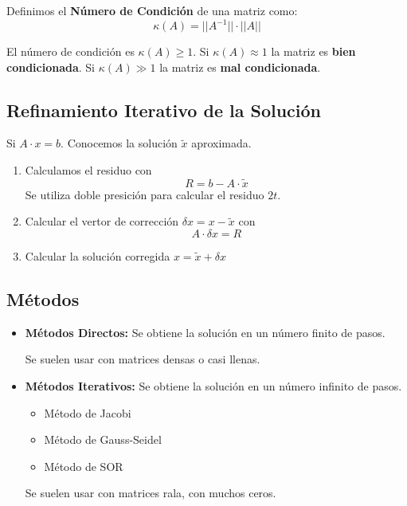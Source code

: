 \documentclass[../main.tex]{subfiles}
\begin{document}
        Definimos el \textbf{Número de Condición} de una matriz como:
        \begin{equation}
            \kappa(A) = ||A^{-1}|| \cdot ||A||
        \end{equation}

        El número de condición es $\kappa(A) \geq 1$. Si $\kappa(A) \approx 1$ la matriz es \textbf{bien condicionada}. Si $\kappa(A) \gg 1$ la matriz es \textbf{mal condicionada}.
    \subsection{Refinamiento Iterativo de la Solución}
        Si $A \cdot x = b$. Conocemos la solución $\widetilde{x}$ aproximada.\\
        \begin{enumerate}
            \item Calculamos el residuo con 
                \begin{equation}
                    R = b - A \cdot \widetilde{x}
                \end{equation}
                Se utiliza doble presición para calcular el residuo $2t$.
            
            \item Calcular el vertor de corrección $\delta x = x - \widetilde{x}$ con
                \begin{equation}
                    A \cdot \delta x = R
                \end{equation}
               
            \item Calcular la solución corregida $x = \widetilde{x} + \delta x$
            \end{enumerate}
    
    \subsection{Métodos}
        \begin{itemize}
            \item \textbf{Métodos Directos:} Se obtiene la solución en un número finito de pasos.
            
                Se suelen usar con matrices densas o casi llenas.
            \item \textbf{Métodos Iterativos:} Se obtiene la solución en un número infinito de pasos.
                \begin{itemize}
                    \item Método de Jacobi
                    \item Método de Gauss-Seidel
                    \item Método de SOR
                \end{itemize}

                Se suelen usar con matrices rala, con muchos ceros.
        \end{itemize}
\end{document}
